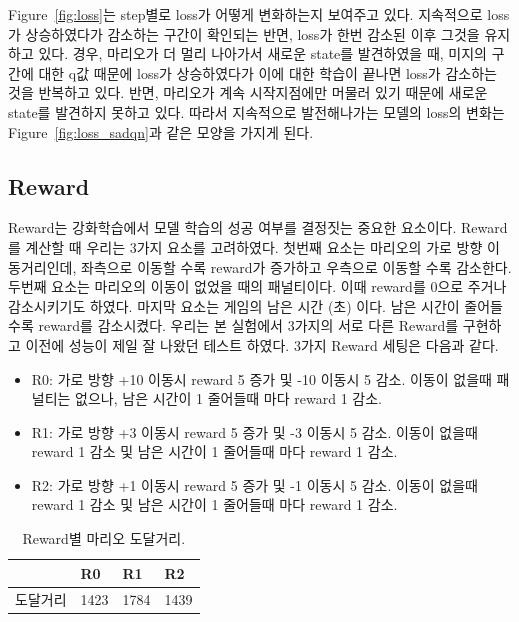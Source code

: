 Figure~\ref{fig:loss}는 step별로   loss가 어떻게 변화하는지 보여주고 있다.
 지속적으로 loss가 상승하였다가 감소하는 구간이 확인되는 반면,  loss가 한번 감소된 이후 그것을 유지하고 있다.
 경우, 마리오가 더 멀리 나아가서 새로운 state를 발견하였을 때, 미지의 구간에 대한 q값 때문에 loss가 상승하였다가 이에 대한 학습이 끝나면 loss가 감소하는 것을 반복하고 있다.
반면,  마리오가 계속 시작지점에만 머물러 있기 때문에 새로운 state를 발견하지 못하고 있다.
따라서 지속적으로 발전해나가는 모델의 loss의 변화는 Figure~\ref{fig:loss_sadqn}과 같은 모양을 가지게 된다.

\subsection{Reward}
\label{sec:exp:reward}
Reward는 강화학습에서 모델 학습의 성공 여부를 결정짓는 중요한 요소이다.
Reward를 계산할 때 우리는 3가지 요소를 고려하였다.
첫번째 요소는 마리오의 가로 방향 이동거리인데, 좌측으로 이동할 수록 reward가 증가하고 우측으로 이동할 수록 감소한다.
두번째 요소는 마리오의 이동이 없었을 때의 패널티이다.
이때 reward를 0으로 주거나 감소시키기도 하였다.
마지막 요소는 게임의 남은 시간 (초) 이다. 남은 시간이 줄어들 수록 reward를 감소시켰다.
우리는 본 실험에서 3가지의 서로 다른 Reward를 구현하고 이전에 성능이 제일 잘 나왔던  테스트 하였다.
3가지 Reward 세팅은 다음과 같다.
\begin{itemize}
	\item \textsc{R0}:
		가로 방향 +10 이동시 reward 5 증가 및 -10 이동시 5 감소. 이동이 없을때 패널티는 없으나, 남은 시간이 1 줄어들때 마다 reward 1 감소.
	\item \textsc{R1}:
		가로 방향 +3 이동시 reward 5 증가 및 -3 이동시 5 감소. 이동이 없을때 reward 1 감소 및 남은 시간이 1 줄어들때 마다 reward 1 감소.
	\item \textsc{R2}:
		가로 방향 +1 이동시 reward 5 증가 및 -1 이동시 5 감소. 이동이 없을때 reward 1 감소 및 남은 시간이 1 줄어들때 마다 reward 1 감소.
\end{itemize}

\begin{table}[h]
\centering
\caption {
	Reward별  마리오 도달거리.
}
\label{tab:reward}
\begin{tabular}{llll}
\toprule
     & R0  & R1 & R2 \\
\midrule
도달거리 & 1423 & 1784  & 1439  \\
\bottomrule
\end{tabular}
\end{table}

